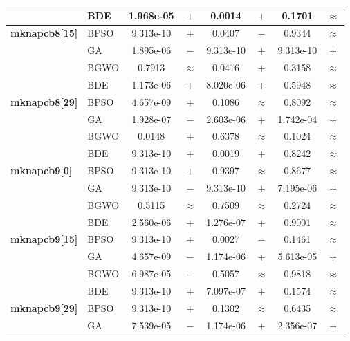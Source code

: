 \begin{table}[htbp]
\begin{tabular*}{\textwidth}{@{\extracolsep{\fill}}llcccccc@{}}
                       & BDE   & 1.968e-05 & $+$ &    0.0014 & $+$ &    0.1701 & $\approx$ \\
    \midrule
    \textbf{mknapcb8[15]} & BPSO  & 9.313e-10 & $+$ &    0.0407 & $-$ &    0.9344 & $\approx$ \\
                       & GA    & 1.895e-06 & $-$ & 9.313e-10 & $+$ & 9.313e-10 & $+$ \\
                       & BGWO  &    0.7913 & $\approx$ &    0.0416 & $+$ &    0.3158 & $\approx$ \\
                       & BDE   & 1.173e-06 & $+$ & 8.020e-06 & $+$ &    0.5948 & $\approx$ \\
    \midrule
    \textbf{mknapcb8[29]} & BPSO  & 4.657e-09 & $+$ &    0.1086 & $\approx$ &    0.8092 & $\approx$ \\
                       & GA    & 1.928e-07 & $-$ & 2.603e-06 & $+$ & 1.742e-04 & $+$ \\
                       & BGWO  &    0.0148 & $+$ &    0.6378 & $\approx$ &    0.1024 & $\approx$ \\
                       & BDE   & 9.313e-10 & $+$ &    0.0019 & $+$ &    0.8242 & $\approx$ \\
    \midrule
    \textbf{mknapcb9[0]} & BPSO  & 9.313e-10 & $+$ &    0.9397 & $\approx$ &    0.8677 & $\approx$ \\
                       & GA    & 9.313e-10 & $-$ & 9.313e-10 & $+$ & 7.195e-06 & $+$ \\
                       & BGWO  &    0.5115 & $\approx$ &    0.7509 & $\approx$ &    0.2724 & $\approx$ \\
                       & BDE   & 2.560e-06 & $+$ & 1.276e-07 & $+$ &    0.9001 & $\approx$ \\
    \midrule
    \textbf{mknapcb9[15]} & BPSO  & 9.313e-10 & $+$ &    0.0027 & $-$ &    0.1461 & $\approx$ \\
                       & GA    & 4.657e-09 & $-$ & 1.174e-06 & $+$ & 5.613e-05 & $+$ \\
                       & BGWO  & 6.987e-05 & $-$ &    0.5057 & $\approx$ &    0.9818 & $\approx$ \\
                       & BDE   & 9.313e-10 & $+$ & 7.097e-07 & $+$ &    0.1574 & $\approx$ \\
    \midrule
    \textbf{mknapcb9[29]} & BPSO  & 9.313e-10 & $+$ &    0.1302 & $\approx$ &    0.6435 & $\approx$ \\
                       & GA    & 7.539e-05 & $-$ & 1.174e-06 & $+$ & 2.356e-07 & $+$ \\

\end{tabular*}
\end{table}
